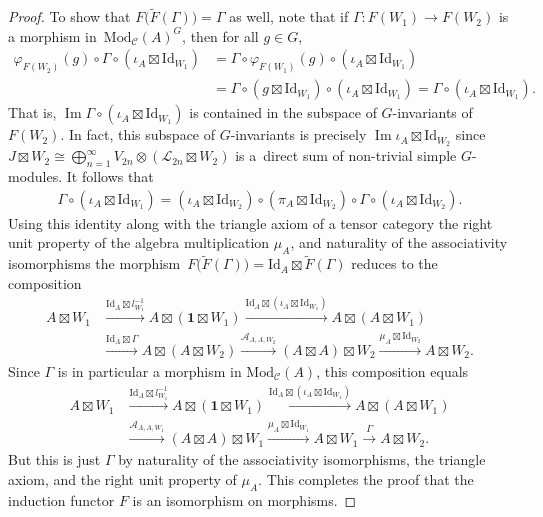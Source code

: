 \documentclass[pdftex]{sigma}
\numberwithin{equation}{section}
\theoremstyle{definition}
\begin{document}
\begin{proof}
To show that $F\bigl(\widetilde{F}(\Gamma)\bigr)=\Gamma$ as well, note that if $\Gamma\colon F(W_1)\rightarrow F(W_2)$ is a morphism in~$\mathrm{Mod}_\mathcal{C}(A)^G$, then for all $g\in G$,
\begin{align*}
\varphi_{F(W_2)}(g)\circ \Gamma\circ(\iota_A\boxtimes\mathrm{Id}_{W_1}) &=\Gamma\circ\varphi_{F(W_1)}(g)\circ(\iota_A\boxtimes\mathrm{Id}_{W_1})\nonumber\\
& =\Gamma\circ(g\boxtimes\mathrm{Id}_{W_1})\circ(\iota_A\boxtimes\mathrm{Id}_{W_1})=\Gamma\circ(\iota_A\boxtimes\mathrm{Id}_{W_1}).
\end{align*}
That is, $\operatorname{Im} \Gamma\circ(\iota_A\boxtimes\mathrm{Id}_{W_1})$ is contained in the subspace of $G$-invariants of $F(W_2)$. In fact, this subspace of $G$-invariants is precisely $\operatorname{Im} \iota_A\boxtimes\mathrm{Id}_{W_2}$ since $J\boxtimes W_2\cong\bigoplus_{n=1}^\infty V_{2n}\otimes(\mathcal{L}_{2n}\boxtimes W_2)$ is a~direct sum of non-trivial simple $G$-modules. It follows that
\begin{gather*}
\Gamma\circ(\iota_A\boxtimes\mathrm{Id}_{W_1}) =(\iota_A\boxtimes\mathrm{Id}_{W_2})\circ(\pi_A\boxtimes\mathrm{Id}_{W_2})\circ\Gamma\circ(\iota_A\boxtimes\mathrm{Id}_{W_2}).
\end{gather*}
Using this identity along with the triangle axiom of a tensor category the right unit property of the algebra multiplication $\mu_A$, and naturality of the associativity isomorphisms the morphism~$F\bigl(\widetilde{F}(\Gamma)\bigr)=\mathrm{Id}_A\boxtimes \widetilde{F}(\Gamma)$ reduces to the composition
\begin{align*}
A\boxtimes W_1 & \xrightarrow{\mathrm{Id}_A\boxtimes l_{W_1}^{-1}} A\boxtimes(\mathbf{1}\boxtimes W_1)\xrightarrow{\mathrm{Id}_A\boxtimes(\iota_A\boxtimes\mathrm{Id}_{W_1})} A\boxtimes(A\boxtimes W_1)\nonumber\\
&\xrightarrow{\mathrm{Id}_A\boxtimes\Gamma} A\boxtimes(A\boxtimes W_2)\xrightarrow{\mathcal{A}_{A,A,W_2}} (A\boxtimes A)\boxtimes W_2\xrightarrow{\mu_A\boxtimes\mathrm{Id}_{W_2}} A\boxtimes W_2.
\end{align*}
Since $\Gamma$ is in particular a morphism in $\mathrm{Mod}_\mathcal{C}(A)$, this composition equals
\begin{align*}
A\boxtimes W_1 & \xrightarrow{\mathrm{Id}_A\boxtimes l_{W_1}^{-1}} A\boxtimes(\mathbf{1}\boxtimes W_1)\xrightarrow{\mathrm{Id}_A\boxtimes(\iota_A\boxtimes\mathrm{Id}_{W_1})} A\boxtimes(A\boxtimes W_1)\nonumber\\
&\xrightarrow{\mathcal{A}_{A,A,W_1}} (A\boxtimes A)\boxtimes W_1\xrightarrow{\mu_A\boxtimes\mathrm{Id}_{W_1}} A\boxtimes W_1 \xrightarrow{\Gamma} A\boxtimes W_2.
\end{align*}
But this is just $\Gamma$ by naturality of the associativity isomorphisms, the triangle axiom, and the right unit property of $\mu_A$. This completes the proof that the induction functor $F$ is an isomorphism on morphisms.
\end{proof}
\end{document}

